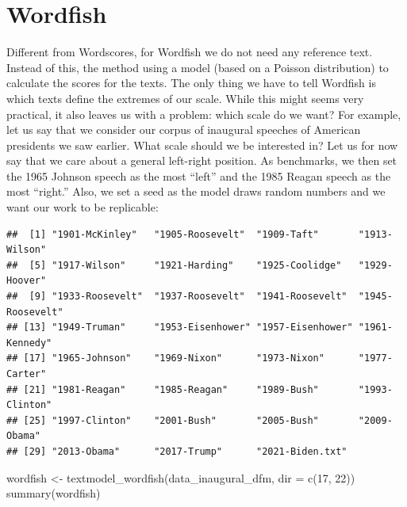 \documentclass[
]{book}
\newenvironment{Shaded}{\begin{snugshade}}{\end{snugshade}}
\newcommand{\AttributeTok}[1]{\textcolor[rgb]{0.77,0.63,0.00}{#1}}
\newcommand{\DecValTok}[1]{\textcolor[rgb]{0.00,0.00,0.81}{#1}}
\newcommand{\FunctionTok}[1]{\textcolor[rgb]{0.00,0.00,0.00}{#1}}
\newcommand{\NormalTok}[1]{#1}
\newcommand{\OtherTok}[1]{\textcolor[rgb]{0.56,0.35,0.01}{#1}}
\newcommand{\SpecialCharTok}[1]{\textcolor[rgb]{0.00,0.00,0.00}{#1}}
\begin{document}
\hypertarget{wordfish}{%
\section{Wordfish}\label{wordfish}}

Different from Wordscores, for Wordfish we do not need any reference text. Instead of this, the method using a model (based on a Poisson distribution) to calculate the scores for the texts. The only thing we have to tell Wordfish is which texts define the extremes of our scale. While this might seems very practical, it also leaves us with a problem: which scale do we want? For example, let us say that we consider our corpus of inaugural speeches of American presidents we saw earlier. What scale should we be interested in? Let us for now say that we care about a general left-right position. As benchmarks, we then set the 1965 Johnson speech as the most ``left'' and the 1985 Reagan speech as the most ``right.'' Also, we set a seed as the model draws random numbers and we want our work to be replicable:

\begin{Shaded}
\end{Shaded}

\begin{verbatim}
##  [1] "1901-McKinley"   "1905-Roosevelt"  "1909-Taft"       "1913-Wilson"    
##  [5] "1917-Wilson"     "1921-Harding"    "1925-Coolidge"   "1929-Hoover"    
##  [9] "1933-Roosevelt"  "1937-Roosevelt"  "1941-Roosevelt"  "1945-Roosevelt" 
## [13] "1949-Truman"     "1953-Eisenhower" "1957-Eisenhower" "1961-Kennedy"   
## [17] "1965-Johnson"    "1969-Nixon"      "1973-Nixon"      "1977-Carter"    
## [21] "1981-Reagan"     "1985-Reagan"     "1989-Bush"       "1993-Clinton"   
## [25] "1997-Clinton"    "2001-Bush"       "2005-Bush"       "2009-Obama"     
## [29] "2013-Obama"      "2017-Trump"      "2021-Biden.txt"
\end{verbatim}

\begin{Shaded}
\begin{Highlighting}[]
\NormalTok{wordfish }\OtherTok{\textless{}{-}} \FunctionTok{textmodel\_wordfish}\NormalTok{(data\_inaugural\_dfm, }\AttributeTok{dir =} \FunctionTok{c}\NormalTok{(}\DecValTok{17}\NormalTok{,}
    \DecValTok{22}\NormalTok{))}
\FunctionTok{summary}\NormalTok{(wordfish)}
\end{Highlighting}
\end{Shaded}
\end{document}
